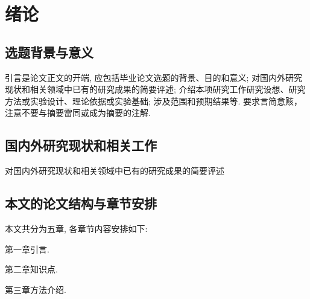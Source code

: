 \documentclass{scutbthesis}
\begin{document}




\section{绪论}
\subsection{选题背景与意义}
\label{sec:background}
引言是论文正文的开端, 应包括毕业论文选题的背景、目的和意义; 对国内外研究现状和相关领域中已有的研究成果的简要评述; 介绍本项研究工作研究设想、研究方法或实验设计、理论依据或实验基础; 涉及范围和预期结果等. 要求言简意赅，注意不要与摘要雷同或成为摘要的注解.

\subsection{国内外研究现状和相关工作}
\label{sec:related_work}
对国内外研究现状和相关领域中已有的研究成果的简要评述

\subsection{本文的论文结构与章节安排}
\label{sec:arrangement}
本文共分为五章, 各章节内容安排如下:

第一章引言.

第二章知识点.

第三章方法介绍.
\end{document}
